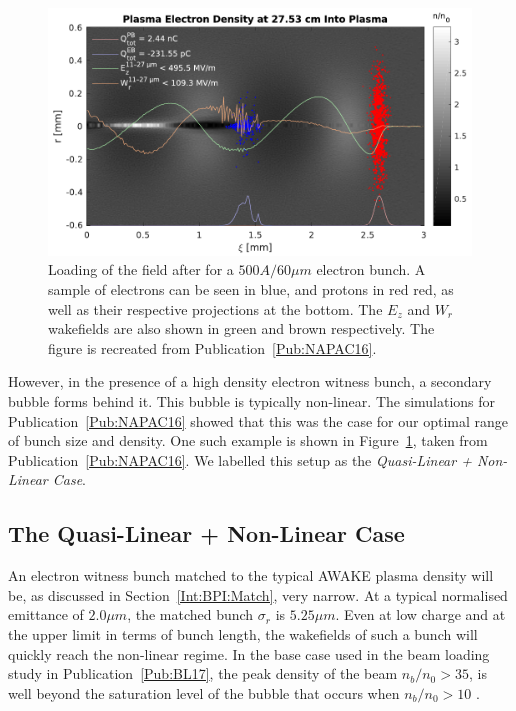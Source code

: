 \begin{figure}[hbt]
    \centering
    \includegraphics[width=0.8125\linewidth]{figures/NAPACPlasmaDensity}
    \caption{\label{Fig:SimA:NAPACPD}
        Loading of the field after for a $500\unit{A}/60\unit{\mu m}$ electron bunch.
        A sample of electrons can be seen in blue, and protons in red red, as well as their respective projections at the bottom.
        The $E_z$ and $W_r$ wakefields are also shown in green and brown respectively.
        The figure is recreated from Publication~\ref{Pub:NAPAC16}.
    }
\end{figure}

However, in the presence of a high density electron witness bunch, a secondary bubble forms behind it.
This bubble is typically non-linear.
The simulations for Publication~\ref{Pub:NAPAC16} showed that this was the case for our optimal range of bunch size and density.
One such example is shown in Figure~\ref{Fig:SimA:NAPACPD}, taken from Publication~\ref{Pub:NAPAC16}.
We labelled this setup as the \textit{Quasi-Linear + Non-Linear Case}.

\subsection{The Quasi-Linear + Non-Linear Case}
\label{SimA:QLinNonLin}

An electron witness bunch matched to the typical AWAKE plasma density will be, as discussed in Section~\ref{Int:BPI:Match}, very narrow.
At a typical normalised emittance of $2.0\unit{\mu m}$, the matched bunch $\sigma_r$ is $5.25\unit{\mu m}$.
Even at low charge and at the upper limit in terms of bunch length, the wakefields of such a bunch will quickly reach the non-linear regime.
In the base case used in the beam loading study in Publication~\ref{Pub:BL17}, the peak density of the beam $n_b/n_0 > 35$, is well beyond the saturation level of the bubble that occurs when $n_b/n_0 > 10$ \cite{lu:2005}.

